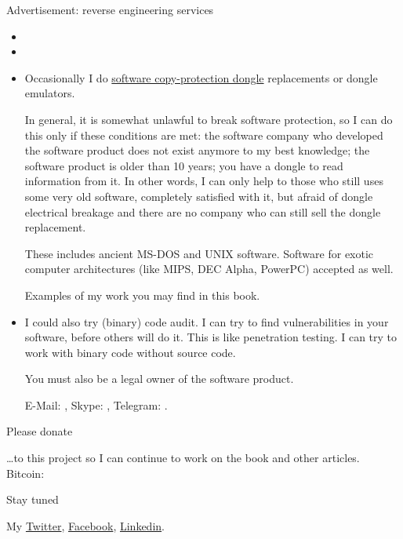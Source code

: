 \vspace*{\fill}

\huge Advertisement: reverse engineering services \normalsize

\bigskip
\bigskip

\begin{itemize}
\item \large {} \normalsize

\item \large {} \normalsize

\item \large {} \normalsize

Occasionally I do \href{https://en.wikipedia.org/wiki/Software_protection_dongle}{software copy-protection dongle} replacements or dongle emulators.

In general, it is somewhat unlawful to break software protection, so I can do this only if these conditions are met:
the software company who developed the software product does not exist anymore to my best knowledge;
the software product is older than 10 years;
you have a dongle to read information from it. In other words, I can only help to those who still uses some very old software, completely satisfied with it, but afraid of dongle electrical breakage and there are no company who can still sell the dongle replacement.

These includes ancient MS-DOS and UNIX software. Software for exotic computer architectures (like MIPS, DEC Alpha, PowerPC) accepted as well.

Examples of my work you may find in this book.

\item \large {} \normalsize

I could also try (binary) code audit.
I can try to find vulnerabilities in your software, before others will do it.
This is like penetration testing.
I can try to work with binary code without source code.

You must also be a legal owner of the software product.

E-Mail: \GTT{\EMAIL}, Skype: , Telegram: .
\end{itemize}

\bigskip

\huge Please donate \normalsize

\bigskip

\dots to this project so I can continue to work on the book and other articles. \\
Bitcoin: 

\huge Stay tuned \normalsize

My
\href{https://twitter.com/yurichev}{Twitter},
\href{https://www.facebook.com/dennis.yurichev.5}{Facebook},
\href{https://ua.linkedin.com/in/dennis-yurichev-5a8368132}{Linkedin}.

\vspace*{\fill}
